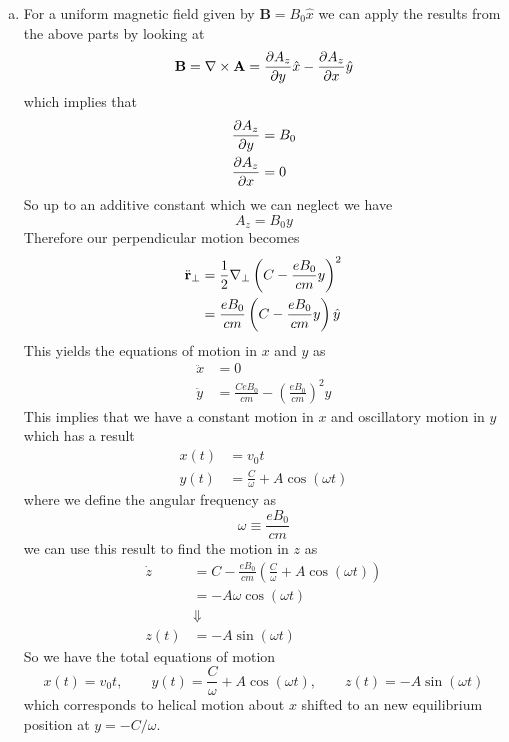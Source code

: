 \documentclass[11pt]{article}
\numberwithin{equation}{section}
\begin{document}
\begin{enumerate}[(a)]
\item For a uniform magnetic field given by $\mathbf{B} = B_0\hat{x}$ we can apply the results
from the above parts by looking at
$$\mathbf{B} = \bold\nabla\times\mathbf{A} = \frac{\partial{A_z}}{\partial{y}}\hat{x} - \frac{\partial{A_z}}{\partial{x}}\hat{y}$$
which implies that 
\begin{align*}
\frac{\partial{A_z}}{\partial{y}} &= B_0\\
\frac{\partial{A_z}}{\partial{x}} &= 0
\end{align*}
So up to an additive constant which we can neglect we have
$$A_z = B_0y$$
Therefore our perpendicular motion becomes
\begin{align*}
\ddot{\mathbf{r}}_{\perp} &= \frac{1}{2}\bold\nabla_{\perp}\left(C-\frac{eB_0}{cm}y\right)^2\\
&= \frac{eB_0}{cm}\left(C-\frac{eB_0}{cm}y\right)\hat{y}\\
\end{align*}
This yields the equations of motion in $x$ and $y$ as
\begin{align*}
\ddot{x} &= 0\\
\ddot{y} &= \frac{CeB_0}{cm}-\left(\frac{eB_0}{cm}\right)^2y
\end{align*}
This implies that we have a constant motion in $x$ and oscillatory motion in $y$ which has
a result
\begin{align*}
x(t) &= v_0t\\
y(t) &= \frac{C}{\omega} + A\cos\left(\omega{t}\right)
\end{align*}
where we define the angular frequency as
$$\omega\equiv\frac{eB_0}{cm}$$
we can use this result to find the motion in $z$ as
\begin{align*}
\dot{z} &= C - \frac{eB_0}{cm}\left(\frac{C}{\omega} + A\cos(\omega{t})\right)\\
&= -A\omega\cos(\omega{t})\\
&\Downarrow\\
z(t) &= -A\sin(\omega{t})
\end{align*}
So we have the total equations of motion 
$$x(t) = v_0t,\qquad y(t) = \frac{C}{\omega} + A\cos\left(\omega{t}\right),\qquad z(t) = -A\sin(\omega{t})$$
which corresponds to helical motion about $x$ shifted to an new equilibrium position at $y=-C/\omega$.



\end{enumerate}
\end{document}
